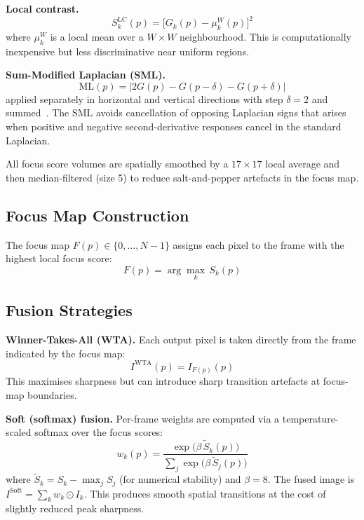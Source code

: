 \documentclass[conference]{IEEEtran}
\begin{document}
\textbf{Local contrast.}
\begin{equation}
  S_k^{\text{LC}}(p) = \bigl[G_k(p) - \mu_k^W(p)\bigr]^2
\end{equation}
where $\mu_k^W$ is a local mean over a $W\!\times\!W$ neighbourhood. This is computationally inexpensive but less discriminative near uniform regions.

\textbf{Sum-Modified Laplacian (SML).}
\begin{equation}
  \text{ML}(p) = |2G(p) - G(p\!-\!\delta) - G(p\!+\!\delta)|
\end{equation}
applied separately in horizontal and vertical directions with step $\delta=2$ and summed~\cite{nayar1994shape,subbarao1998optimal}. The SML avoids cancellation of opposing Laplacian signs that arises when positive and negative second-derivative responses cancel in the standard Laplacian.

All focus score volumes are spatially smoothed by a $17\!\times\!17$ local average and then median-filtered (size 5) to reduce salt-and-pepper artefacts in the focus map.

\subsection{Focus Map Construction}

The focus map $F(p) \in \{0,\ldots,N-1\}$ assigns each pixel to the frame with the highest local focus score:
\begin{equation}
  F(p) = \arg\max_{k}\, S_k(p)
\end{equation}

\subsection{Fusion Strategies}

\textbf{Winner-Takes-All (WTA).}
Each output pixel is taken directly from the frame indicated by the focus map:
\begin{equation}
  I^{\text{WTA}}(p) = I_{F(p)}(p)
\end{equation}
This maximises sharpness but can introduce sharp transition artefacts at focus-map boundaries.

\textbf{Soft (softmax) fusion.}
Per-frame weights are computed via a temperature-scaled softmax over the focus scores:
\begin{equation}
  w_k(p) = \frac{\exp\!\bigl(\beta\,\tilde{S}_k(p)\bigr)}{\sum_j \exp\!\bigl(\beta\,\tilde{S}_j(p)\bigr)}
\end{equation}
where $\tilde{S}_k = S_k - \max_j S_j$ (for numerical stability) and $\beta=8$. The fused image is $I^{\text{Soft}} = \sum_k w_k \odot I_k$. This produces smooth spatial transitions at the cost of slightly reduced peak sharpness.
\end{document}
